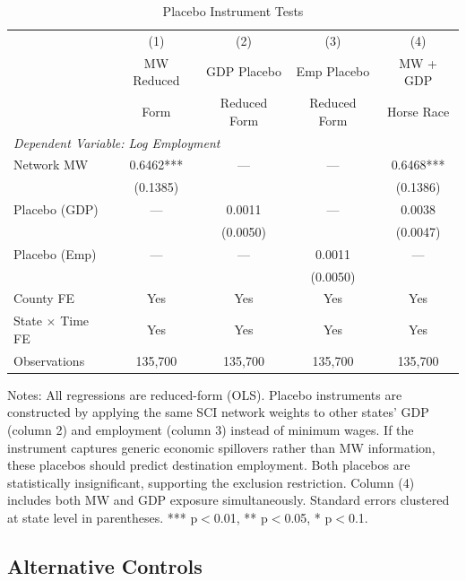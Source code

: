\documentclass[12pt]{article}
\newenvironment{figurenotes}{\par\vspace{0.5em}\footnotesize\noindent}{\par}
\begin{document}
\begin{table}[H]
\centering
\caption{Placebo Instrument Tests}
\label{tab:robustB3}
\small
\begin{tabular}{l cccc}
\toprule
 & (1) & (2) & (3) & (4) \\
 & MW Reduced & GDP Placebo & Emp Placebo & MW + GDP \\
 & Form & Reduced Form & Reduced Form & Horse Race \\
\midrule
\multicolumn{5}{l}{\textit{Dependent Variable: Log Employment}} \\[3pt]
Network MW & 0.6462*** & --- & --- & 0.6468*** \\
 & (0.1385) & & & (0.1386) \\
\addlinespace
Placebo (GDP) & --- & 0.0011 & --- & 0.0038 \\
 & & (0.0050) & & (0.0047) \\
\addlinespace
Placebo (Emp) & --- & --- & 0.0011 & --- \\
 & & & (0.0050) & \\
\midrule
County FE & Yes & Yes & Yes & Yes \\
State $\times$ Time FE & Yes & Yes & Yes & Yes \\
Observations & 135,700 & 135,700 & 135,700 & 135,700 \\
\bottomrule
\end{tabular}
\begin{figurenotes}
Notes: All regressions are reduced-form (OLS). Placebo instruments are constructed
by applying the same SCI network weights to other states' GDP (column 2) and employment
(column 3) instead of minimum wages. If the instrument captures generic economic
spillovers rather than MW information, these placebos should predict destination
employment. Both placebos are statistically insignificant, supporting the
exclusion restriction. Column (4) includes both MW and GDP exposure simultaneously.
Standard errors clustered at state level in parentheses.
*** p$<$0.01, ** p$<$0.05, * p$<$0.1.
\end{figurenotes}
\end{table}

\subsection{Alternative Controls}
\end{document}

